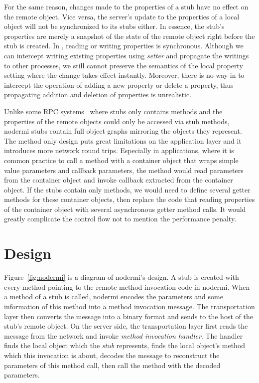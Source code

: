 For the same reason,
changes made to the properties of a stub have no effect on the remote object.
Vice versa, the server's update to the properties of a local object will 
not be synchronized to its stubs either.
In essence,
the stub's properties are merely a snapshot of the state of 
the remote object right before the stub is created.
In \js{}, reading or writing properties is synchronous.
Although we can intercept writing existing properties using
\emph{setter} and propagate the writings to other processes,
we still cannot preserve the semantics of the local property setting
where the change takes effect instantly. 
Moreover, there is no way in \js{} to intercept the operation of adding a new property or delete
a property, 
thus propagating addition and deletion of properties is unrealistic.

Unlike some RPC systems~\cite{birrell1993distributed} 
where stubs only contains methods and the properties of the remote
objects could only be accessed via stub methods,
nodermi stubs contain full object graphs mirroring the objects they represent.
The method only design puts great limitations on the
application layer and it introduces more network round trips.
Especially in \js{} applications, where 
 it is common practice to call a method with
a container object that wraps simple value parameters and callback parameters,
the method would read parameters from the container object and invoke callback
extracted from the container object.
If the stubs contain only methods, 
we would need to define several getter methods 
for these container objects, 
then replace the code that reading properties of the container object
 with several asynchronous getter method calls.
It would greatly complicate the control flow
not to mention the performance penalty.


\section{Design}

\nodermifig{}

Figure~\ref{fig:nodermi} is a diagram of nodermi's design.
A stub is created with every method pointing to the 
remote method invocation code in nodermi.
When a method of a stub is called,
nodermi encodes the parameters and some information of this method 
into a method invocation message.
The transportation layer then converts the message into 
a binary format and sends to the host of the stub's remote object.
On the server side, the transportation layer first reads 
the message from the network and invoke \emph{method invocation handler}.
The handler finds the local object which the \emph{stub}
represents,
finds the local object's method which this invocation is about,
decodes the message to reconstruct the parameters of this method call,
then call the method with the decoded parameters.


